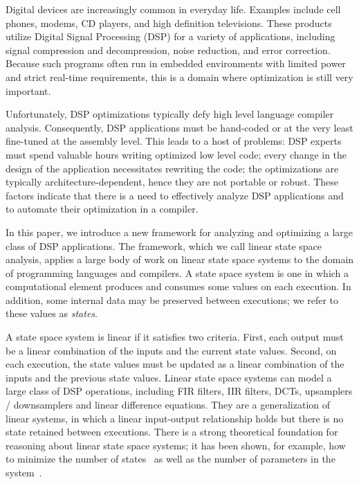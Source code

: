

Digital devices are increasingly common in everyday life. Examples
include cell phones, modems, CD players, and high definition
televisions. These products utilize Digital Signal Processing (DSP)
for a variety of applications, including signal compression and
decompression, noise reduction, and error correction.  Because such
programs often run in embedded environments with limited power and
strict real-time requirements, this is a domain where optimization is
still very important.

Unfortunately, DSP optimizations typically defy high level language
compiler analysis.  Consequently, DSP applications must be hand-coded
or at the very least fine-tuned at the assembly level. This leads to a
host of problems: DSP experts must spend valuable hours writing
optimized low level code; every change in the design of the
application necessitates rewriting the code; the optimizations are
typically architecture-dependent, hence they are not portable or
robust.  These factors indicate that there is a need to effectively
analyze DSP applications and to automate their optimization in a
compiler.

In this paper, we introduce a new framework for analyzing and
optimizing a large class of DSP applications.  The framework, which we
call linear state space analysis, applies a large body of work on
linear state space systems to the domain of programming languages and
compilers.  A state space system is one in which a computational
element produces and consumes some values on each execution.  In
addition, some internal data may be preserved between executions; we
refer to these values as {\it states}.

A state space system is linear if it satisfies two criteria.  First,
each output must be a linear combination of the inputs and the current
state values.  Second, on each execution, the state values must be
updated as a linear combination of the inputs and the previous state
values.  Linear state space systems can model a large class of DSP
operations, including FIR filters, IIR filters, DCTs, upsamplers /
downsamplers and linear difference equations.  They are a
generalization of linear systems, in which a linear input-output
relationship holds but there is no state retained between executions.
There is a strong theoretical foundation for reasoning about linear
state space systems; it has been shown, for example, how to minimize
the number of states~\cite{Moore} as well as the number of parameters
in the system~\cite{Ackermann/Bucy,Mayne,Schutter}.


